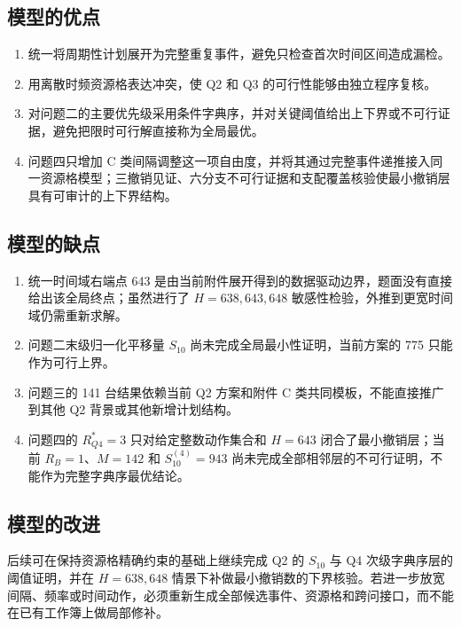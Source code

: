 \subsection{模型的优点}
\begin{enumerate}[label=(\arabic*)]
  \item 统一将周期性计划展开为完整重复事件，避免只检查首次时间区间造成漏检。
  \item 用离散时频资源格表达冲突，使 Q2 和 Q3 的可行性能够由独立程序复核。
  \item 对问题二的主要优先级采用条件字典序，并对关键阈值给出上下界或不可行证据，避免把限时可行解直接称为全局最优。
  \item 问题四只增加 C 类间隔调整这一项自由度，并将其通过完整事件递推接入同一资源格模型；三撤销见证、六分支不可行证据和支配覆盖核验使最小撤销层具有可审计的上下界结构。
\end{enumerate}

\subsection{模型的缺点}
\begin{enumerate}[label=(\arabic*)]
  \item 统一时间域右端点 643 是由当前附件展开得到的数据驱动边界，题面没有直接给出该全局终点；虽然进行了 \(H=638,643,648\) 敏感性检验，外推到更宽时间域仍需重新求解。
  \item 问题二末级归一化平移量 \(S_{10}\) 尚未完成全局最小性证明，当前方案的 775 只能作为可行上界。
  \item 问题三的 141 台结果依赖当前 Q2 方案和附件 C 类共同模板，不能直接推广到其他 Q2 背景或其他新增计划结构。
  \item 问题四的 \(R_{Q4}^{\ast}=3\) 只对给定整数动作集合和 \(H=643\) 闭合了最小撤销层；当前 \(R_B=1\)、\(M=142\) 和 \(S_{10}^{(4)}=943\) 尚未完成全部相邻层的不可行证明，不能作为完整字典序最优结论。
\end{enumerate}

\subsection{模型的改进}
后续可在保持资源格精确约束的基础上继续完成 Q2 的 \(S_{10}\) 与 Q4 次级字典序层的阈值证明，并在 \(H=638,648\) 情景下补做最小撤销数的下界核验。若进一步放宽间隔、频率或时间动作，必须重新生成全部候选事件、资源格和跨问接口，而不能在已有工作簿上做局部修补。
